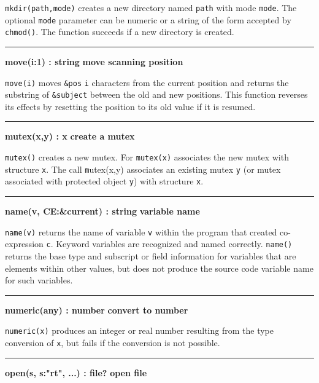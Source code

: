 \noindent
{}
\texttt{mkdir(path,mode)} creates a new directory named \texttt{path} with
mode \texttt{mode}. The optional \texttt{mode} parameter can be numeric or a
string of the form accepted by \texttt{chmod()}. The function succeeds
if a new directory is created.

\bigskip\hrule\vspace{0.1cm}
\noindent
{\bf move(i:1) : string } \hfill {\bf move scanning position}

\noindent
{}\texttt{move(i)} moves \texttt{\&pos} \texttt{i}
characters from the current position and returns the substring of
\texttt{\&subject} between the old and new positions. This function
reverses its effects by resetting the position to its old value if it
is resumed.

\bigskip\hrule\vspace{0.1cm}
\noindent
{\bf mutex(x,y) : x } \hfill {\bf create a mutex}

\noindent
{}\texttt{mutex()} creates a new mutex. For \texttt{mutex(x)}
associates the new mutex with structure \texttt{x}.
The call {\texttt mutex(x,y)} associates an existing mutex \texttt{y} (or
mutex associated with protected object \texttt{y}) with
structure \texttt{x}.

\bigskip\hrule\vspace{0.1cm}
\noindent
{\bf name(v, CE:\&current) : string } \hfill {\bf variable name}

\noindent
{}\texttt{name(v)} returns the name of variable \texttt{v}
within the program that created co-expression \texttt{c}. Keyword
variables are recognized and named correctly. \texttt{name()} returns
the base type and subscript or field information for variables that are
elements within other values, but does not produce the source code
variable name for such variables. 

\bigskip\hrule\vspace{0.1cm}
\noindent
{\bf numeric(any) : number } \hfill {\bf convert to number}

\noindent
{}\texttt{numeric(x)} produces an integer or real
number resulting from the type conversion of \texttt{x}, but fails if
the conversion is not possible.

\bigskip\hrule\vspace{0.1cm}
\noindent
{\bf open(s, s:"rt", ...) : file? } \hfill {\bf open file}

